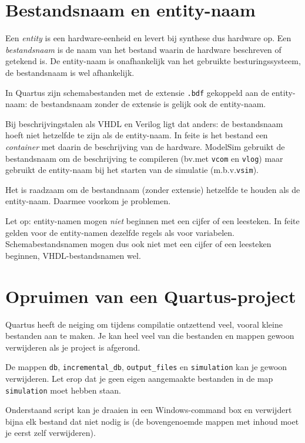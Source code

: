 \documentclass[a4paper,12pt,fleqn,twoside]{book}
\newcommand{\naam}[1]{\texttt{#1}}
\begin{document}
\section{Bestandsnaam en entity-naam}
\label{sec:bestandsnaamenentitynaam}
Een \textsl{entity} is een hardware-eenheid en levert bij synthese
dus hardware op. Een \textsl{bestandsnaam} is de naam van het bestand
waarin de hardware beschreven of getekend is. De entity-naam is
onafhankelijk van het gebruikte besturingssysteem, de bestandsnaam is
wel afhankelijk.

In Quartus zijn schemabestanden met de extensie \naam{.bdf}
gekoppeld aan de entity-naam: de bestandsnaam zonder de extensie
is gelijk ook de entity-naam.

Bij beschrijvingstalen als VHDL en Verilog ligt dat anders: de
bestandsnaam hoeft niet hetzelfde te zijn als de entity-naam. In feite
is het bestand een \textsl{container} met daarin de beschrijving
van de hardware. ModelSim gebruikt de bestandsnaam om de beschrijving
te compileren (bv.\@ met \naam{vcom} en \naam{vlog}) maar gebruikt de
entity-naam bij het starten van de simulatie (m.b.v.\@ \naam{vsim}).

Het is raadzaam om de bestandnaam (zonder extensie) hetzelfde te houden
als de entity-naam. Daarmee voorkom je problemen.

Let op: entity-namen mogen \textsl{niet} beginnen met een cijfer of
een leesteken. In feite gelden voor de entity-namen dezelfde regels als
voor variabelen. Schemabestandsnamen mogen dus ook niet met een cijfer
of een leesteken beginnen, VHDL-bestandsnamen wel.


\section{Opruimen van een Quartus-project}
\label{sec:opruimenvaneenquartusproject}
Quartus heeft de neiging om tijdens compilatie ontzettend veel, vooral kleine
bestanden aan te maken. Je kan heel veel van die bestanden en mappen gewoon
verwijderen als je project is afgerond.

De mappen \lstinline|db|, \lstinline|incremental_db|, \lstinline|output_files|
en \lstinline|simulation| kan je gewoon verwijderen. Let erop dat je geen
eigen aangemaakte bestanden in de map \lstinline|simulation| moet hebben staan.

Onderstaand script kan je draaien in een Windows-command box en verwijdert
bijna elk bestand dat niet nodig is (de bovengenoemde mappen met inhoud
moet je eerst zelf verwijderen).
\end{document}
